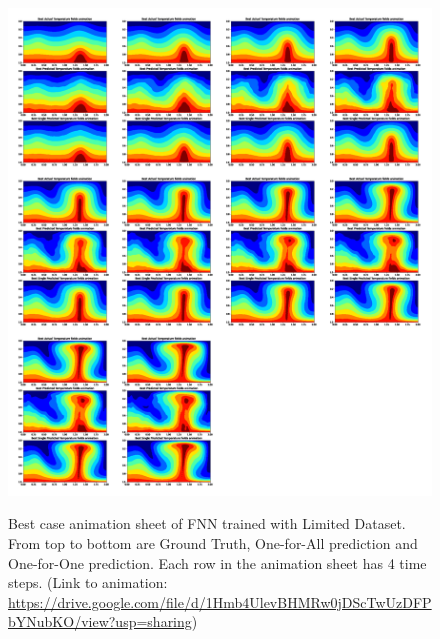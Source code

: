 \begin{figure}[H]
    \centering
    \caption{Best case animation sheet of FNN trained with Limited Dataset. From top to bottom are Ground Truth, One-for-All prediction and One-for-One prediction. Each row in the animation sheet has 4 time steps. (Link to animation: \url{https://drive.google.com/file/d/1Hmb4UlevBHMRw0jDScTwUzDFPbYNubKO/view?usp=sharing})}
    \includegraphics[scale=0.23]{figures/mantle_convection_images/limited_dataset/FNN_Best_GIF_sheet.png}
    \label{figure:FNN_limited_best_gif}
\end{figure}

